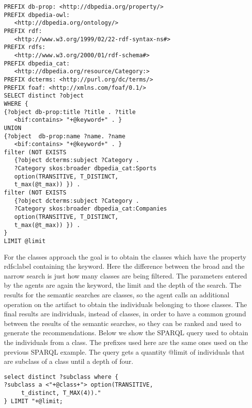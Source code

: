 \documentclass[a4paper,twoside]{article}
\begin{document}
\begin{small}
\begin{verbatim}
PREFIX db-prop: <http://dbpedia.org/property/>
PREFIX dbpedia-owl:
   <http://dbpedia.org/ontology/>
PREFIX rdf:
   <http://www.w3.org/1999/02/22-rdf-syntax-ns#>
PREFIX rdfs:
   <http://www.w3.org/2000/01/rdf-schema#>
PREFIX dbpedia_cat:
   <http://dbpedia.org/resource/Category:>
PREFIX dcterms: <http://purl.org/dc/terms/>
PREFIX foaf: <http://xmlns.com/foaf/0.1/>
SELECT distinct ?object
WHERE {
{?object db-prop:title ?title . ?title
   <bif:contains> "+@keyword+" . }
UNION 
{?object  db-prop:name ?name. ?name
   <bif:contains> "+@keyword+" . }
filter (NOT EXISTS
   {?object dcterms:subject ?Category .
   ?Category skos:broader dbpedia_cat:Sports
   option(TRANSITIVE, T_DISTINCT,
   t_max(@t_max)) }) .
filter (NOT EXISTS
   {?object dcterms:subject ?Category .
   ?Category skos:broader dbpedia_cat:Companies
   option(TRANSITIVE, T_DISTINCT,
   t_max(@t_max)) }) .
}
LIMIT @limit
\end{verbatim}
\end{small}

For the classes approach the goal is to obtain the classes which have the property rdfs:label containing the keyword. Here the difference between the broad and the narrow search is just how many classes are being filtered. The parameters entered by the agents are again the keyword, the limit and the depth of the search. The results for the semantic searches are classes, so the agent calls an additional operation on the artifact to obtain the individuals belonging to those classes. The final results are individuals, instead of classes, in order to have a common ground between the results of the semantic searches, so they can be ranked and used to generate the recommendations. Below we show the SPARQL query used to obtain the individuals from a class. The prefixes used here are the same ones used on the previous SPARQL example. The query gets a quantity @limit of individuals that are subclass of a class until a depth of four.

\begin{small}
\begin{verbatim}
select distinct ?subclass where {
?subclass a <"+@class+"> option(TRANSITIVE,
     t_distinct, T_MAX(4))."
} LIMIT "+@limit;
\end{verbatim}
\end{small}
\end{document}
